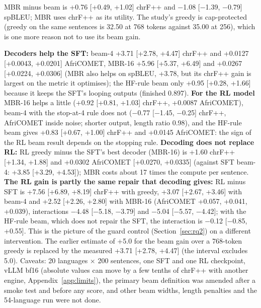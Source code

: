 MBR minus beam is +0.76 [+0.49, +1.02] chrF++ and \ensuremath{-}1.08 [\ensuremath{-}1.39, \ensuremath{-}0.79] spBLEU; MBR uses chrF++ as its utility. The study's greedy is cap-protected (greedy on the same sentences is 32.50 at 768 tokens against 35.00 at 256), which is one more reason not to use its beam gain.

 \textbf{Decoders help the SFT:} beam-4 +3.71 [+2.78, +4.47] chrF++ and +0.0127 [+0.0043, +0.0201] AfriCOMET, MBR-16 +5.96 [+5.37, +6.49] and +0.0267 [+0.0224, +0.0306] (MBR also helps on spBLEU, +3.78, but its chrF++ gain is largest on the metric it optimises); the HF-rule beam only +0.95 [+0.28, +1.66] because it keeps the SFT's looping outputs (finished 0.897). \textbf{For the RL model} MBR-16 helps a little (+0.92 [+0.81, +1.03] chrF++, +0.0087 AfriCOMET), beam-4 with the stop-at-4 rule does not (\ensuremath{-}0.77 [\ensuremath{-}1.45, \ensuremath{-}0.25] chrF++, AfriCOMET inside noise; shorter output, length ratio 0.98), and the HF-rule beam gives +0.83 [+0.67, +1.00] chrF++ and +0.0145 AfriCOMET: the sign of the RL beam result depends on the stopping rule. \textbf{Decoding does not replace RL:} RL greedy minus the SFT's best decoder (MBR-16) is +1.60 chrF++ [+1.34, +1.88] and +0.0302 AfriCOMET [+0.0270, +0.0335] (against SFT beam-4: +3.85 [+3.29, +4.53]); MBR costs about 17 times the compute per sentence. \textbf{The RL gain is partly the same repair that decoding gives:} RL minus SFT is +7.56 [+6.89, +8.19] chrF++ with greedy, +3.07 [+2.67, +3.46] with beam-4 and +2.52 [+2.26, +2.80] with MBR-16 (AfriCOMET +0.057, +0.041, +0.039), interactions \ensuremath{-}4.48 [\ensuremath{-}5.18, \ensuremath{-}3.79] and \ensuremath{-}5.04 [\ensuremath{-}5.57, \ensuremath{-}4.42]; with the HF-rule beam, which does not repair the SFT, the interaction is \ensuremath{-}0.12 [\ensuremath{-}0.85, +0.55]. This is the picture of the guard control (Section~\ref{sec:rq2}) on a different intervention. The earlier estimate of +5.0 for the beam gain over a 768-token greedy is replaced by the measured +3.71 [+2.78, +4.47] (the interval excludes 5.0). Caveats: 20 languages $\times$ 200 sentences, one SFT and one RL checkpoint, vLLM bf16 (absolute values can move by a few tenths of chrF++ with another engine, Appendix~\ref{app:limits}), the primary beam definition was amended after a smoke test and before any score, and other beam widths, length penalties and the 54-language run were not done.


